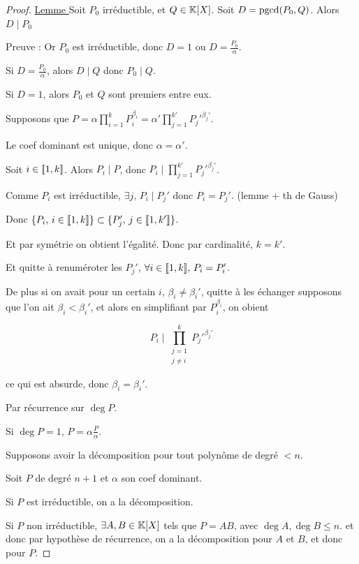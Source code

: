 
\begin{proof}
    \uline{Lemme } Soit $P_0$ irréductible, et $Q \in \mathbb{K}[X]$. Soit $D = \operatorname{pgcd}(P_0, Q)$.
    Alors $D \mid P_0$

    \avspace Preuve : Or $P_0$ est irréductible, donc $D = 1$ ou $D = \frac {P_0} \alpha$.

    Si $D = \frac {P_0} \alpha$, alors $D \mid Q$ donc $P_0 \mid Q$.

    Si $D = 1$, alors $P_0$ et $Q$ sont premiers entre eux.

    \lvspace {}

    Supposons que $\displaystyle P = \alpha \prod_{i = 1}^k P_i^{\beta_i} = \alpha' \prod_{j = 1}^{k'} P_j'^{\beta_j'}$.

    Le coef dominant est unique, donc $\alpha = \alpha'$.

    Soit $i \in [\![1, k]\!]$. Alors $P_i \mid P$, donc $\displaystyle P_i \mid \prod_{j = 1}^{k'} P_j'^{\beta_j'}$.

    Comme $P_i$ est irréductible, $\exists j, \, P_i \mid P_j'$ donc $P_i = P_j'$. (lemme + th de Gauss)

    Donc $\{P_i, \, i \in [\![1, k]\!] \} \subset \{P_j', \, j \in [\![1, k']\!]\}$.

    Et par symétrie on obtient l'égalité. Donc par cardinalité, $k = k'$.

    Et quitte à renuméroter les $P_j'$, $\forall i \in [\![1, k]\!], \, P_i = P_i'$.

    De plus si on avait pour un certain $i$, $\beta_i \neq \beta_i'$, quitte à les échanger supposons 
    que l'on ait $\beta_i < \beta_i'$, et alors en simplifiant par $P_i^{\beta_i}$, on obient
    
    $$P_i \mid \prod_{\substack{j = 1 \\ j \neq i}}^k P_j'^{\beta_j'}$$

    ce qui est absurde, donc $\beta_i = \beta_i'$.


    Par récurrence sur $\deg P$. 

    Si $\deg P = 1$, $P = \alpha \frac P \alpha$. 

    Supposons avoir la décomposition pour tout polynôme de degré $< n$. 

    Soit $P$ de degré $n + 1$ et $\alpha$ son coef dominant.

    Si $P$ est irréductible, on a la décomposition.

    Si $P$ non irréductible, $\exists A, B \in \mathbb{K}[X]$ tels que $P = AB$, avec $\deg A, \deg B \leqslant n$.
    et donc par hypothèse de récurrence, on a la décomposition pour $A$ et $B$, et donc pour $P$.
\end{proof}

